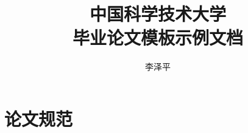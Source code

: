 \documentclass[doctor]{ustcthesis}
\title{中国科学技术大学\\毕业论文模板示例文档}
\author{李泽平}
\begin{document}
\maketitle

%
%
%

\frontmatter

\tableofcontents
% 

\mainmatter










\appendix
\chapter{论文规范}

\backmatter


\end{document}
